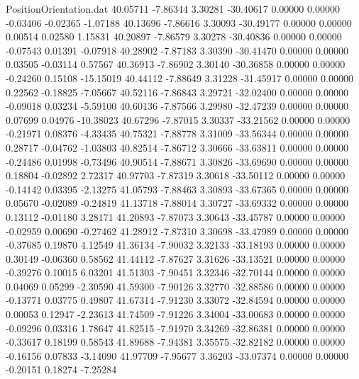 \begin{filecontents}{PositionOrientation.dat}
  40.05711   -7.86344    3.30281   -30.40617    0.00000    0.00000   -0.03406   -0.02365   -1.07188
  40.13696   -7.86616    3.30093   -30.49177    0.00000    0.00000    0.00514    0.02580    1.15831
  40.20897   -7.86579    3.30278   -30.40836    0.00000    0.00000   -0.07543    0.01391   -0.07918
  40.28902   -7.87183    3.30390   -30.41470    0.00000    0.00000    0.03505   -0.03114    0.57567
  40.36913   -7.86902    3.30140   -30.36858    0.00000    0.00000   -0.24260    0.15108  -15.15019
  40.44112   -7.88649    3.31228   -31.45917    0.00000    0.00000    0.22562   -0.18825   -7.05667
  40.52116   -7.86843    3.29721   -32.02400    0.00000    0.00000   -0.09018    0.03234   -5.59100
  40.60136   -7.87566    3.29980   -32.47239    0.00000    0.00000    0.07699    0.04976  -10.38023
  40.67296   -7.87015    3.30337   -33.21562    0.00000    0.00000   -0.21971    0.08376   -4.33435
  40.75321   -7.88778    3.31009   -33.56344    0.00000    0.00000    0.28717   -0.04762   -1.03803
  40.82514   -7.86712    3.30666   -33.63811    0.00000    0.00000   -0.24486    0.01998   -0.73496
  40.90514   -7.88671    3.30826   -33.69690    0.00000    0.00000    0.18804   -0.02892    2.72317
  40.97703   -7.87319    3.30618   -33.50112    0.00000    0.00000   -0.14142    0.03395   -2.13275
  41.05793   -7.88463    3.30893   -33.67365    0.00000    0.00000    0.05670   -0.02089   -0.24819
  41.13718   -7.88014    3.30727   -33.69332    0.00000    0.00000    0.13112   -0.01180    3.28171
  41.20893   -7.87073    3.30643   -33.45787    0.00000    0.00000   -0.02959    0.00690   -0.27462
  41.28912   -7.87310    3.30698   -33.47989    0.00000    0.00000   -0.37685    0.19870    4.12549
  41.36134   -7.90032    3.32133   -33.18193    0.00000    0.00000    0.30149   -0.06360    0.58562
  41.44112   -7.87627    3.31626   -33.13521    0.00000    0.00000   -0.39276    0.10015    6.03201
  41.51303   -7.90451    3.32346   -32.70144    0.00000    0.00000    0.04069    0.05299   -2.30590
  41.59300   -7.90126    3.32770   -32.88586    0.00000    0.00000   -0.13771    0.03775    0.49807
  41.67314   -7.91230    3.33072   -32.84594    0.00000    0.00000    0.00053    0.12947   -2.23613
  41.74509   -7.91226    3.34004   -33.00683    0.00000    0.00000   -0.09296    0.03316    1.78647
  41.82515   -7.91970    3.34269   -32.86381    0.00000    0.00000   -0.33617    0.18199    0.58543
  41.89688   -7.94381    3.35575   -32.82182    0.00000    0.00000   -0.16156    0.07833   -3.14090
  41.97709   -7.95677    3.36203   -33.07374    0.00000    0.00000   -0.20151    0.18274   -7.25284

\end{filecontents}
